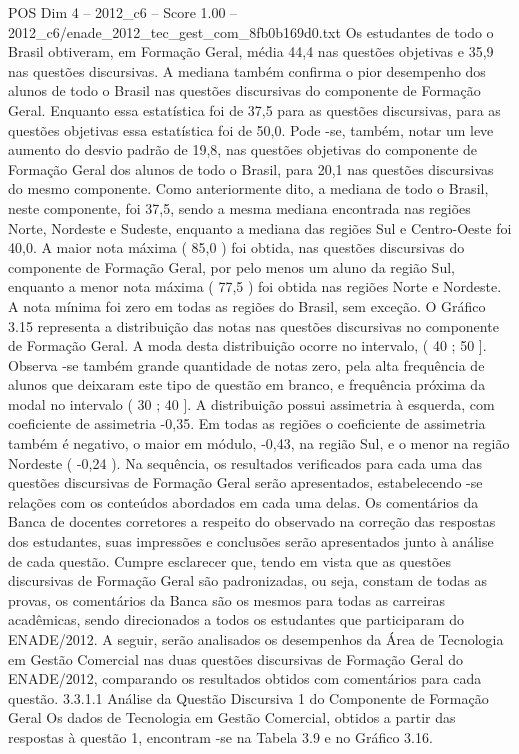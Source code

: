 \begin{textsample}{POS Dim 4 – 2012\_c6 – Score 1.00 – 2012\_c6/enade\_2012\_tec\_gest\_com\_8fb0b169d0.txt}
Os estudantes de todo o Brasil obtiveram, em Formação Geral, média 44,4 nas questões objetivas e 35,9 nas questões discursivas.
A mediana também confirma o pior desempenho dos alunos de todo o Brasil nas questões discursivas do componente de Formação Geral.
Enquanto essa estatística foi de 37,5 para as questões discursivas, para as questões objetivas essa estatística foi de 50,0.
Pode -se, também, notar um leve aumento do desvio padrão de 19,8, nas questões objetivas do componente de Formação Geral dos alunos de todo o Brasil, para 20,1 nas questões discursivas do mesmo componente.
Como anteriormente dito, a mediana de todo o Brasil, neste componente, foi 37,5, sendo a mesma mediana encontrada nas regiões Norte, Nordeste e Sudeste, enquanto a mediana das regiões Sul e Centro-Oeste foi 40,0.
A maior nota máxima ( 85,0 ) foi obtida, nas questões discursivas do componente de Formação Geral, por pelo menos um aluno da região Sul, enquanto a menor nota máxima ( 77,5 ) foi obtida nas regiões Norte e Nordeste.
A nota mínima foi zero em todas as regiões do Brasil, sem exceção.
O Gráfico 3.15 representa a distribuição das notas nas questões discursivas no componente de Formação Geral.
A moda desta distribuição ocorre no intervalo, ( 40 ; 50 ].
Observa -se também grande quantidade de notas zero, pela alta frequência de alunos que deixaram este tipo de questão em branco, e frequência próxima da modal no intervalo ( 30 ; 40 ].
A distribuição possui assimetria à esquerda, com coeficiente de assimetria -0,35.
Em todas as regiões o coeficiente de assimetria também é negativo, o maior em módulo, -0,43, na região Sul, e o menor na região Nordeste ( -0,24 ).
Na sequência, os resultados verificados para cada uma das questões discursivas de Formação Geral serão apresentados, estabelecendo -se relações com os conteúdos abordados em cada uma delas.
Os comentários da Banca de docentes corretores a respeito do observado na correção das respostas dos estudantes, suas impressões e conclusões serão apresentados junto à análise de cada questão.
Cumpre esclarecer que, tendo em vista que as questões discursivas de Formação Geral são padronizadas, ou seja, constam de todas as provas, os comentários da Banca são os mesmos para todas as carreiras acadêmicas, sendo direcionados a todos os estudantes que participaram do ENADE/2012.
A seguir, serão analisados os desempenhos da Área de Tecnologia em Gestão Comercial nas duas questões discursivas de Formação Geral do ENADE/2012, comparando os resultados obtidos com comentários para cada questão. 3.3.1.1 Análise da Questão Discursiva 1 do Componente de Formação Geral Os dados de Tecnologia em Gestão Comercial, obtidos a partir das respostas à questão 1, encontram -se na Tabela 3.9 e no Gráfico 3.16.

\end{textsample}
